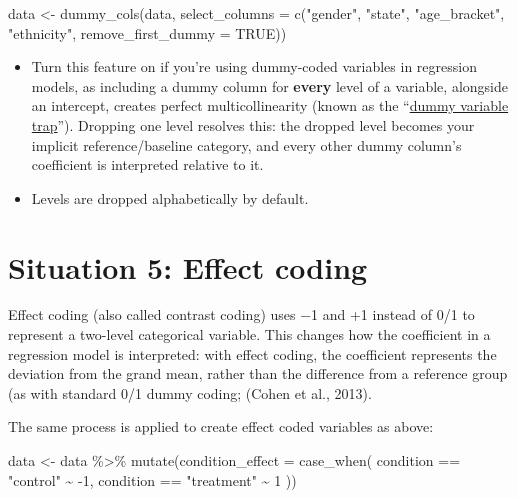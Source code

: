 \documentclass[
  letterpaper,
  DIV=11,
  numbers=noendperiod]{scrreprt}
\newenvironment{Shaded}{\begin{snugshade}}{\end{snugshade}}
\newcommand{\AttributeTok}[1]{\textcolor[rgb]{0.40,0.45,0.13}{#1}}
\newcommand{\ConstantTok}[1]{\textcolor[rgb]{0.56,0.35,0.01}{#1}}
\newcommand{\DecValTok}[1]{\textcolor[rgb]{0.68,0.00,0.00}{#1}}
\newcommand{\FunctionTok}[1]{\textcolor[rgb]{0.28,0.35,0.67}{#1}}
\newcommand{\NormalTok}[1]{\textcolor[rgb]{0.00,0.23,0.31}{#1}}
\newcommand{\OtherTok}[1]{\textcolor[rgb]{0.00,0.23,0.31}{#1}}
\newcommand{\SpecialCharTok}[1]{\textcolor[rgb]{0.37,0.37,0.37}{#1}}
\newcommand{\StringTok}[1]{\textcolor[rgb]{0.13,0.47,0.30}{#1}}
\providecommand{\tightlist}{%
  \setlength{\itemsep}{0pt}\setlength{\parskip}{0pt}}\usepackage{longtable,booktabs,array}
\begin{document}
\begin{Shaded}
\begin{Highlighting}[]
\NormalTok{data }\OtherTok{\textless{}{-}} \FunctionTok{dummy\_cols}\NormalTok{(data, }\AttributeTok{select\_columns =} \FunctionTok{c}\NormalTok{(}\StringTok{"gender"}\NormalTok{, }\StringTok{"state"}\NormalTok{, }\StringTok{"age\_bracket"}\NormalTok{, }\StringTok{"ethnicity"}\NormalTok{, }\AttributeTok{remove\_first\_dummy =} \ConstantTok{TRUE}\NormalTok{))}
\end{Highlighting}
\end{Shaded}

\begin{itemize}
\tightlist
\item
  Turn this feature on if you're using dummy-coded variables in
  regression models, as including a dummy column for \textbf{every}
  level of a variable, alongside an intercept, creates perfect
  multicollinearity (known as the
  ``\href{https://www.statology.org/dummy-variable-trap/}{dummy variable
  trap}''). Dropping one level resolves this: the dropped level becomes
  your implicit reference/baseline category, and every other dummy
  column's coefficient is interpreted relative to it.
\item
  Levels are dropped alphabetically by default.
\end{itemize}

\section{Situation 5: Effect coding}\label{situation-5-effect-coding}

Effect coding (also called contrast coding) uses −1 and +1 instead of
0/1 to represent a two-level categorical variable. This changes how the
coefficient in a regression model is interpreted: with effect coding,
the coefficient represents the deviation from the grand mean, rather
than the difference from a reference group (as with standard 0/1 dummy
coding; (Cohen et al., 2013).

The same process is applied to create effect coded variables as above:

\begin{Shaded}
\begin{Highlighting}[]
\NormalTok{data }\OtherTok{\textless{}{-}}\NormalTok{ data }\SpecialCharTok{\%\textgreater{}\%}
  \FunctionTok{mutate}\NormalTok{(}\AttributeTok{condition\_effect =} \FunctionTok{case\_when}\NormalTok{(}
\NormalTok{    condition }\SpecialCharTok{==} \StringTok{"control"} \SpecialCharTok{\textasciitilde{}} \SpecialCharTok{{-}}\DecValTok{1}\NormalTok{,}
\NormalTok{    condition }\SpecialCharTok{==} \StringTok{"treatment"} \SpecialCharTok{\textasciitilde{}} \DecValTok{1}
\NormalTok{  ))}
\end{Highlighting}
\end{Shaded}
\end{document}
